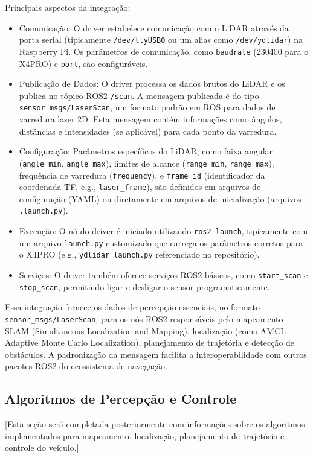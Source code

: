 Principais aspectos da integração:
\begin{itemize}
      \item Comunicação: O driver estabelece comunicação com o LiDAR através da porta
            serial (tipicamente \texttt{/dev/ttyUSB0} ou um alias como
            \texttt{/dev/ydlidar}) na Raspberry Pi. Os parâmetros de comunicação, como
            \texttt{baudrate} (230400 para o X4PRO) e \texttt{port}, são configuráveis.
      \item Publicação de Dados: O driver processa os dados brutos do LiDAR e os publica no
            tópico ROS2 \texttt{/scan}. A mensagem publicada é do tipo
            \texttt{sensor\_msgs/LaserScan}, um formato padrão em ROS para dados de
            varredura laser 2D. Esta mensagem contém informações como ângulos, distâncias e
            intensidades (se aplicável) para cada ponto da varredura.
      \item Configuração: Parâmetros específicos do LiDAR, como faixa angular
            (\texttt{angle\_min}, \texttt{angle\_max}), limites de alcance
            (\texttt{range\_min}, \texttt{range\_max}), frequência de varredura
            (\texttt{frequency}), e \texttt{frame\_id} (identificador da coordenada TF,
            e.g., \texttt{laser\_frame}), são definidos em arquivos de configuração (YAML)
            ou diretamente em arquivos de inicialização (arquivos \texttt{.launch.py}).
      \item Execução: O nó do driver é iniciado utilizando \texttt{ros2 launch},
            tipicamente com um arquivo \texttt{launch.py} customizado que carrega os
            parâmetros corretos para o X4PRO (e.g., \texttt{ydlidar\_launch.py}
            referenciado no repositório).
      \item Serviços: O driver também oferece serviços ROS2 básicos, como
            \texttt{start\_scan} e \texttt{stop\_scan}, permitindo ligar e desligar o
            sensor programaticamente.
\end{itemize}

Essa integração fornece os dados de percepção essenciais, no formato
\texttt{sensor\_msgs/LaserScan}, para os nós ROS2 responsáveis pelo mapeamento
SLAM (Simultaneous Localization and Mapping), localização (como AMCL --
Adaptive Monte Carlo Localization), planejamento de trajetória e detecção de
obstáculos. A padronização da mensagem facilita a interoperabilidade com outros
pacotes ROS2 do ecossistema de navegação.

\subsection{Algoritmos de Percepção e Controle}

[Esta seção será completada posteriormente com informações sobre os algoritmos implementados para mapeamento, localização, planejamento de trajetória e controle do veículo.]
